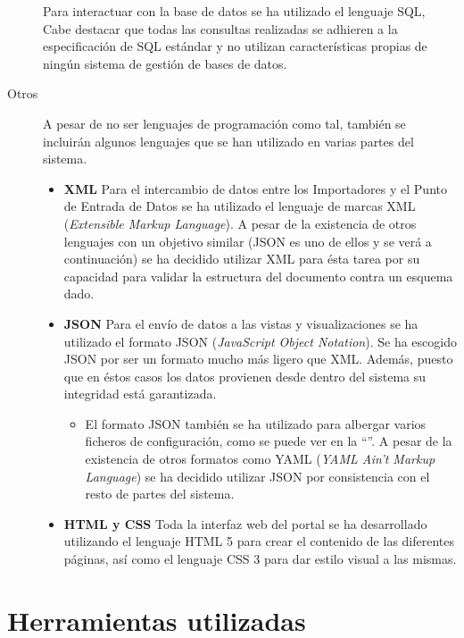 \begin{description}
			Para interactuar con la base de datos se ha utilizado el lenguaje SQL, Cabe destacar que todas las consultas realizadas se adhieren a la especificación de SQL estándar y no utilizan características propias de ningún sistema de gestión de bases de datos.
		\item[Otros]
			A pesar de no ser lenguajes de programación como tal, también se incluirán algunos lenguajes que se han utilizado en varias partes del sistema.
			\begin{itemize}
				\item \textbf{XML}
					Para el intercambio de datos entre los Importadores y el Punto de Entrada de Datos se ha utilizado el lenguaje de marcas XML (\textit{Extensible Markup Language}).  A pesar de la existencia de otros lenguajes con un objetivo similar (JSON es uno de ellos y se verá a continuación) se ha decidido utilizar XML para ésta tarea por su capacidad para validar la estructura del documento contra un esquema dado.
				\item \textbf{JSON}
					Para el envío de datos a las vistas y visualizaciones se ha utilizado el formato JSON (\textit{JavaScript Object Notation}).  Se ha escogido JSON por ser un formato mucho más ligero que XML.  Además, puesto que en éstos casos los datos provienen desde dentro del sistema su integridad está garantizada.
						\begin{itemize}
							\item
								El formato JSON también se ha utilizado para albergar varios ficheros de configuración, como se puede ver en la ``''.  A pesar de la existencia de otros formatos como YAML (\textit{YAML Ain't Markup Language}) se ha decidido utilizar JSON por consistencia con el resto de partes del sistema.
						\end{itemize}
				\item \textbf{HTML y CSS}
					Toda la interfaz web del portal se ha desarrollado utilizando el lenguaje HTML 5 para crear el contenido de las diferentes páginas, así como el lenguaje CSS 3 para dar estilo visual a las mismas.
			\end{itemize}
	\end{description}


\section{Herramientas utilizadas}
\label{implementacion:herramientas_utilizadas}

